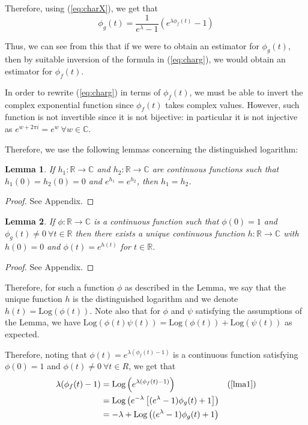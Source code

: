 \documentclass[a4paper,11pt]{article}
\theoremstyle{theorem}
\newtheorem{lem}{Lemma}[section]
\theoremstyle{definition}
\begin{document}
Therefore, using (\ref{eq:charX}), we get that
\begin{equation}
\phi_{g}(t) = \frac{1}{e^{\lambda} - 1}(e^{\lambda \phi_{f}(t)} - 1) \label{eq:charg}
\end{equation}

Thus, we can see from this that if we were to obtain an estimator for $\phi_{g}(t)$, then by suitable inversion of the formula in (\ref{eq:charg}), we would obtain an estimator for $\phi_{f}(t)$.

In order to rewrite (\ref{eq:charg}) in terms of $\phi_{f}(t)$, we must be able to invert the complex exponential function since $\phi_{f}(t)$ takes complex values. However, such function is not invertible since it is not bijective: in particular it is not injective as $e^{w + 2 \pi i} = e^{w} \ \forall w \in \mathbb{C}$.

Therefore, we use the following lemmas concerning the distinguished logarithm:

\begin{lem} \label{lma1}
If $h_{1} : \mathbb{R} \to \mathbb{C}$ and $h_{2} : \mathbb{R} \to \mathbb{C}$ are continuous functions such that $h_{1}(0) = h_{2}(0) = 0$ and $e^{h_{1}} = e^{h_{2}}$, then $h_{1} = h_{2}$. 
\end{lem}

\begin{proof}
See Appendix.
\end{proof}

\begin{lem} \label{lma2}
If $\phi : \mathbb{R} \to \mathbb{C}$ is a continuous function such that $\phi(0) = 1$ and $\phi_{g}(t) \neq 0 \ \forall t \in \mathbb{R}$ then there exists a unique continuous function $h : \mathbb{R} \to \mathbb{C}$ with $h(0) = 0$ and $\phi(t) = e^{h(t)}$ for $t \in \mathbb{R}$. 
\end{lem}

\begin{proof}
See Appendix.
\end{proof}

Therefore, for such a function $\phi$ as described in the Lemma, we say that the unique function $h$ is the distinguished logarithm and we denote $h(t) = \text{Log}(\phi(t))$. Note also that for $\phi$ and $\psi$ satisfying the assumptions of the Lemma, we have $\text{Log}(\phi(t)\psi(t)) = \text{Log}(\phi(t)) + \text{Log}(\psi(t))$ as expected.  

Therefore, noting that $\phi(t) = e^{\lambda(\phi_{f}(t) - 1)}$ is a continuous function satisfying $\phi(0) = 1$ and $\phi(t) \neq 0 \ \forall t \in R$, we get that
\begin{align*}
\lambda(\phi_{f}(t) - 1) &= \text{Log}\left(e^{\lambda (\phi_{f}(t) - 1)}\right)& \text{(\cref{lma1})} \\
                         &= \text{Log}\left(e^{-\lambda}\left[(e^{\lambda} - 1)\phi_{g}(t) + 1\right] \right) \\
                         &= -\lambda + \text{Log}\left((e^{\lambda} - 1)\phi_{g}(t) + 1\right)
\end{align*}
\end{document}
